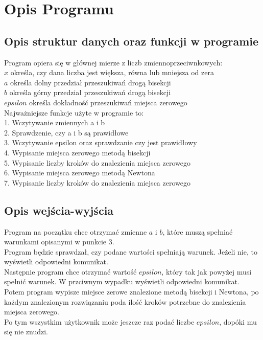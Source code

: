 \documentclass[11pt]{article} %
\begin{document}
\section{Opis Programu}
\subsection{Opis struktur danych oraz funkcji w programie}
Program opiera się w głównej mierze z liczb zmiennoprzeciwnkowych:\\
$x$ określa, czy dana liczba jest większa, równa lub mniejsza od zera\\
$a$ określa dolny przedział przeszukiwań drogą bisekcji\\
$b$ określa górny przedział przeszukiwań drogą bisekcji\\
$epsilon$ określa dokładność przeszukiwań miejsca zerowego\\
Najważniejsze funkcje użyte w programie to:\\
1. Wczytywanie zmiennych a i b\\
2. Sprawdzenie, czy a i b są prawidłowe\\
3. Wczytywanie epsilon oraz sprawdzanie czy jest prawidłowy\\
4. Wypisanie miejsca zerowego metodą bisekcji\\
5. Wypisanie liczby kroków do znalezienia miejsca zerowego\\
6. Wypisanie miejsca zerowego metodą Newtona\\
7. Wypisanie liczby kroków do znalezienia miejsca zerowego\\
\subsection{Opis wejścia-wyjścia}
Program na początku chce otrzymać zmienne $a$ i $b$, które muszą spełniać warunkami opisanymi w punkcie 3.\\
Program będzie sprawdzał, czy podane wartości spełniają warunek. Jeżeli nie, to wyświetli odpowiedni komunikat.\\
Następnie program chce otrzymać wartość $epsilon$, który tak jak powyżej musi spełnić warunek. W przciwnym wypadku wyświetli odpowiedni komunikat.\\
Potem program wypisze miejsce zerowe znalezione metodą bisekcji i Newtona, po każdym znalezionym rozwiązaniu poda ilość kroków potrzebne do znalezienia miejsca zerowego.\\
Po tym wszystkim użytkownik może jeszcze raz podać liczbe $epsilon$, dopóki mu się nie znudzi.\\ 
\end{document}
